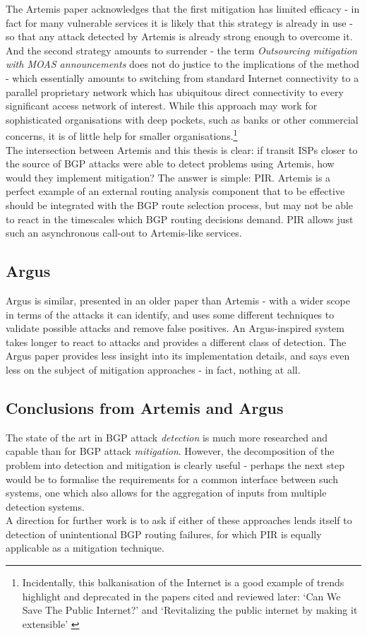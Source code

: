 The Artemis paper acknowledges that the first mitigation has limited efficacy - in fact for many vulnerable services it is likely that this strategy is already in use - so that any attack detected by Artemis is already strong enough to overcome it.  And the second strategy amounts to surrender - the term \emph{Outsourcing mitigation with MOAS announcements} does not do justice to the implications of the method - which essentially amounts to switching from standard Internet connectivity to a parallel proprietary network which has ubiquitous direct connectivity to every significant access network of interest.  While this approach may work for sophisticated organisations with deep pockets, such as banks or other commercial concerns, it is of little help for smaller organisations.\footnote{Incidentally, this balkanisation of the Internet is a good example of trends highlight and deprecated in the papers cited and reviewed later: `Can We Save The Public Internet?' \cite{blumenthal2024} and `Revitalizing the public internet by making it extensible' \cite{Balakrishnan2021}}
\\
The intersection between Artemis and this thesis is clear: if transit ISPs closer to the source of BGP attacks were able to detect problems using Artemis, how would they implement mitigation?  The answer is simple: PIR.  Artemis is a perfect example of an external routing analysis component that to be effective should be integrated with the BGP route selection process, but may not be able to react in the timescales which BGP routing decisions demand.  PIR allows just such an asynchronous call-out to Artemis-like services.
\subsection{Argus}
Argus is similar, presented in an older paper than Artemis\cite{argus1}\cite{argus2}
- with a wider scope in terms of the attacks it can identify, and uses some different techniques to validate possible attacks and remove false positives.  An Argus-inspired system takes longer to react to attacks and provides a different class of detection.  The Argus paper provides less insight into its implementation details, and says even less on the subject of mitigation approaches - in fact, nothing at all.
\subsection{Conclusions from Artemis and Argus}
The state of the art in BGP attack \textit{detection} is much more researched and capable than for BGP attack \textit{mitigation}.  However, the decomposition of the problem into detection and mitigation is clearly useful - perhaps the next step would be to formalise the requirements for a common interface between such systems, one which also allows for the aggregation of inputs from multiple detection systems.
\\
A direction for further work is to ask if either of these approaches lends itself to detection of unintentional BGP routing failures, for which PIR is equally applicable as a mitigation technique.

